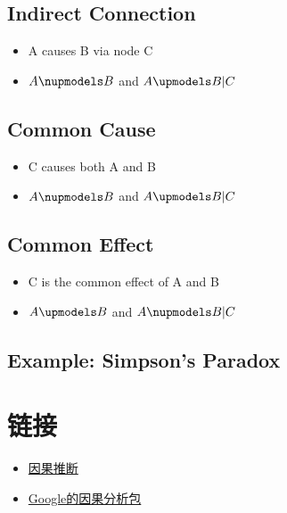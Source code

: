 \documentclass[]{book}
\providecommand{\tightlist}{%
  \setlength{\itemsep}{0pt}\setlength{\parskip}{0pt}}
\begin{document}
\hypertarget{indirect-connection}{%
\subsection{Indirect Connection}\label{indirect-connection}}

\begin{itemize}
\tightlist
\item
  A causes B via node C
\item
  \(A \nupmodels B\) and \(A \upmodels B|C\)
\end{itemize}

\hypertarget{common-cause}{%
\subsection{Common Cause}\label{common-cause}}

\begin{itemize}
\tightlist
\item
  C causes both A and B
\item
  \(A \nupmodels B\) and \(A \upmodels B|C\)
\end{itemize}

\hypertarget{common-effect}{%
\subsection{Common Effect}\label{common-effect}}

\begin{itemize}
\tightlist
\item
  C is the common effect of A and B
\item
  \(A \upmodels B\) and \(A \nupmodels B|C\)
\end{itemize}

\hypertarget{example-simpsons-paradox}{%
\subsection{Example: Simpson's Paradox}\label{example-simpsons-paradox}}

\hypertarget{yinguolink}{%
\section{链接}\label{yinguolink}}

\begin{itemize}
\tightlist
\item
  \href{https://cosx.org/2012/03/causality1-simpson-paradox}{因果推断}
\item
  \href{https://github.com/google/CausalImpact}{Google的因果分析包}
\end{itemize}
\end{document}

